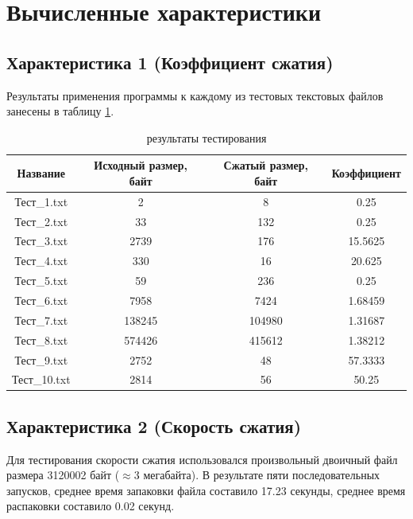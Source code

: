 \documentclass[a4paper,oneside]{article}
\theoremstyle{definition}
\begin{document}
\section{Вычисленные характеристики}

\subsection{Характеристика 1 (Коэффициент сжатия)}

Результаты применения программы к каждому из тестовых текстовых файлов занесены
в таблицу \ref{tbl:results}.

\begin{table}[H]
  \small
  \centering
  \begin{tabular}{|c|c|c|c|}
    \hline
    Название     & Исходный размер, байт & Сжатый размер, байт & Коэффициент \\ \hline \hline
    Тест\_1.txt  & 2           &      8      & 0.25    \\ \hline
    Тест\_2.txt  & 33          &    132      & 0.25    \\ \hline
    Тест\_3.txt  & 2739        &    176      & 15.5625 \\ \hline
    Тест\_4.txt  & 330         &     16      & 20.625  \\ \hline
    Тест\_5.txt  & 59          &    236      & 0.25    \\ \hline
    Тест\_6.txt  & 7958        &   7424      & 1.68459 \\ \hline
    Тест\_7.txt  & 138245      & 104980      & 1.31687 \\ \hline
    Тест\_8.txt  & 574426      & 415612      & 1.38212 \\ \hline
    Тест\_9.txt  & 2752        &     48      & 57.3333 \\ \hline
    Тест\_10.txt & 2814        &     56      & 50.25   \\ \hline
  \end{tabular}
  \caption{результаты тестирования}
  \label{tbl:results}
\end{table}

\subsection{Характеристика 2 (Скорость сжатия)}

Для тестирования скорости сжатия использовался произвольный двоичный
файл размера 3120002 байт ($\approx$3 мегабайта). В результате пяти
последовательных запусков, среднее время запаковки файла составило 17.23
секунды, среднее время распаковки составило 0.02 секунд.
\end{document}
